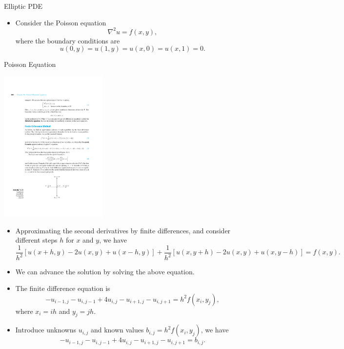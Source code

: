 \documentclass{beamer}
\newcommand{\beforeverb}{\footnotesize}
\newcommand{\afterverb}{\normalsize}
\begin{document}
\begin{frame}{Elliptic PDE}
    \begin{itemize}
        \item Consider the Poisson equation
        \[  
        \nabla^2 u = f(x, y),
        \]
        where the boundary conditions are
        \[
        u(0, y) = u(1, y) = u(x, 0) = u(x, 1) = 0.
        \]
    \end{itemize}
\end{frame}
\begin{frame}{Poisson Equation}
    \centerline{\includegraphics[width=0.4\textwidth]{LaplaceEqn.pdf}}
    \begin{itemize}
        \item Approximating the second derivatives by finite differences, and consider different steps 
        $h$ for $x$ and $y$, we have
        \beforeverb
        \[
        \frac{1}{h^2}[u(x+h, y)-2 u(x, y)+u(x-h, y)]+\frac{1}{h^2}[u(x, y+h)-2 u(x, y)+u(x, y-h)]=f(x, y).
        \]
        \afterverb
    \end{itemize}
\end{frame}
\begin{frame}
    \begin{itemize}
        \item We can advance the solution by solving the above equation.
        \item The finite difference equation is
        \[
        -u_{i-1,j}-u_{i,j-1}+4 u_{i,j}-u_{i+1,j}-u_{i,j+1}=h^2 f(x_i, y_j),
        \]
        where $x_i=ih$ and $y_j=jh$.
        \item Introduce unknowns $u_{i,j}$ and known values $b_{i,j}=h^2 f(x_i, y_j)$, we have 
        \[
        -u_{i-1,j}-u_{i,j-1}+4 u_{i,j}-u_{i+1,j}-u_{i,j+1}=b_{i,j}.
        \]
    \end{itemize}

\end{frame}
\end{document}
